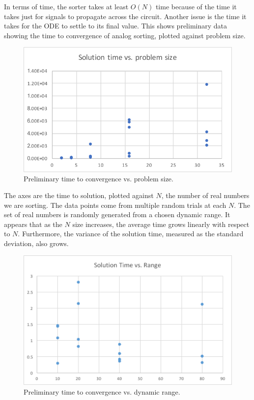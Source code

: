 In terms of time, the sorter takes at least $O(N)$ time because of the time it takes just for signals to propagate across the circuit.
Another issue is the time it takes for the ODE to settle to its final value.
This shows preliminary data showing the time to convergence of analog sorting, plotted against problem size.

\begin{figure}[h]
\centering
\includegraphics[width=\columnwidth]{graphics/ode_time_vs_problem_size.pdf}
\caption{Preliminary time to convergence vs. problem size.}
\end{figure}

The axes are the time to solution, plotted against $N$, the number of real numbers we are sorting.
The data points come from multiple random trials at each $N$.
The set of real numbers is randomly generated from a chosen dynamic range.
It appears that as the $N$ size increases, the average time grows linearly with respect to $N$.
Furthermore, the variance of the solution time, measured as the standard deviation, also grows.

\begin{figure}[h]
\centering
\includegraphics[width=\columnwidth]{graphics/range_vs_solution.png}
\caption{Preliminary time to convergence vs. dynamic range.}
\end{figure}

